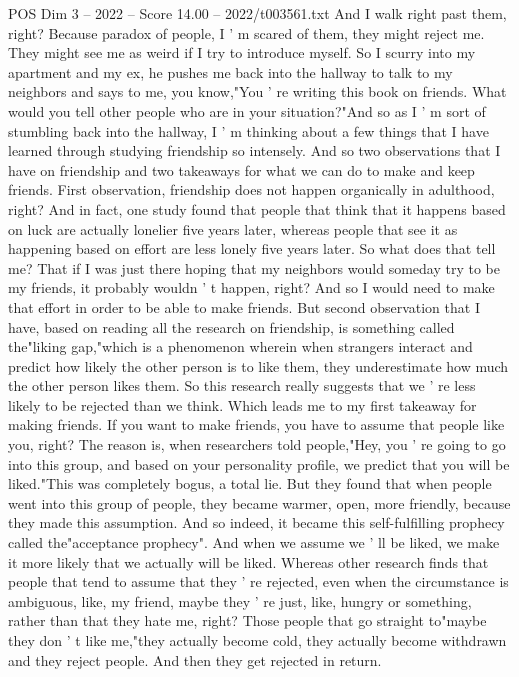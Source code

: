 \begin{textsample}{POS Dim 3 – 2022 – Score 14.00 – 2022/t003561.txt}
And I walk right past them, right?
Because paradox of people, I ' m scared of them, they might reject me.
They might see me as weird if I try to introduce myself.
So I scurry into my apartment and my ex, he pushes me back into the hallway to talk to my neighbors and says to me, you know,"You ' re writing this book on friends.
What would you tell other people who are in your situation?"And so as I ' m sort of stumbling back into the hallway, I ' m thinking about a few things that I have learned through studying friendship so intensely.
And so two observations that I have on friendship and two takeaways for what we can do to make and keep friends.
First observation, friendship does not happen organically in adulthood, right?
And in fact, one study found that people that think that it happens based on luck are actually lonelier five years later, whereas people that see it as happening based on effort are less lonely five years later.
So what does that tell me?
That if I was just there hoping that my neighbors would someday try to be my friends, it probably wouldn ' t happen, right?
And so I would need to make that effort in order to be able to make friends.
But second observation that I have, based on reading all the research on friendship, is something called the"liking gap,"which is a phenomenon wherein when strangers interact and predict how likely the other person is to like them, they underestimate how much the other person likes them.
So this research really suggests that we ' re less likely to be rejected than we think.
Which leads me to my first takeaway for making friends.
If you want to make friends, you have to assume that people like you, right?
The reason is, when researchers told people,"Hey, you ' re going to go into this group, and based on your personality profile, we predict that you will be liked."This was completely bogus, a total lie.
But they found that when people went into this group of people, they became warmer, open, more friendly, because they made this assumption.
And so indeed, it became this self-fulfilling prophecy called the"acceptance prophecy".
And when we assume we ' ll be liked, we make it more likely that we actually will be liked.
Whereas other research finds that people that tend to assume that they ' re rejected, even when the circumstance is ambiguous, like, my friend, maybe they ' re just, like, hungry or something, rather than that they hate me, right?
Those people that go straight to"maybe they don ' t like me,"they actually become cold, they actually become withdrawn and they reject people.
And then they get rejected in return.

\end{textsample}
